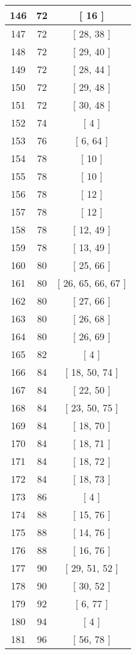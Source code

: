 \begin{center}
\begin{longtable}[H]{|| c c c ||}
\hline
146 & 72 & [ 16 ] \\ 
\hline
147 & 72 & [ 28, 38 ] \\ 
\hline
148 & 72 & [ 29, 40 ] \\ 
\hline
149 & 72 & [ 28, 44 ] \\ 
\hline
150 & 72 & [ 29, 48 ] \\ 
\hline
151 & 72 & [ 30, 48 ] \\ 
\hline
152 & 74 & [ 4 ] \\ 
\hline
153 & 76 & [ 6, 64 ] \\ 
\hline
154 & 78 & [ 10 ] \\ 
\hline
155 & 78 & [ 10 ] \\ 
\hline
156 & 78 & [ 12 ] \\ 
\hline
157 & 78 & [ 12 ] \\ 
\hline
158 & 78 & [ 12, 49 ] \\ 
\hline
159 & 78 & [ 13, 49 ] \\ 
\hline
160 & 80 & [ 25, 66 ] \\ 
\hline
161 & 80 & [ 26, 65, 66, 67 ] \\ 
\hline
162 & 80 & [ 27, 66 ] \\ 
\hline
163 & 80 & [ 26, 68 ] \\ 
\hline
164 & 80 & [ 26, 69 ] \\ 
\hline
165 & 82 & [ 4 ] \\ 
\hline
166 & 84 & [ 18, 50, 74 ] \\ 
\hline
167 & 84 & [ 22, 50 ] \\ 
\hline
168 & 84 & [ 23, 50, 75 ] \\ 
\hline
169 & 84 & [ 18, 70 ] \\ 
\hline
170 & 84 & [ 18, 71 ] \\ 
\hline
171 & 84 & [ 18, 72 ] \\ 
\hline
172 & 84 & [ 18, 73 ] \\ 
\hline
173 & 86 & [ 4 ] \\ 
\hline
174 & 88 & [ 15, 76 ] \\ 
\hline
175 & 88 & [ 14, 76 ] \\ 
\hline
176 & 88 & [ 16, 76 ] \\ 
\hline
177 & 90 & [ 29, 51, 52 ] \\ 
\hline
178 & 90 & [ 30, 52 ] \\ 
\hline
179 & 92 & [ 6, 77 ] \\ 
\hline
180 & 94 & [ 4 ] \\ 
\hline
181 & 96 & [ 56, 78 ] \\ 

\end{longtable}
\end{center}
